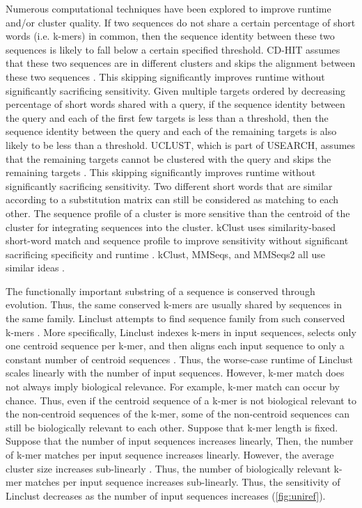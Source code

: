 \documentclass[11pt,letterpaper]{article}
\begin{document}
Numerous computational techniques have been explored to improve runtime and/or cluster quality.
If two sequences do not share a certain percentage of short words (i.e. k-mers) in common, then the sequence identity between these two sequences is likely to fall below a certain specified threshold.
CD-HIT assumes that these two sequences are in different clusters and skips the alignment between these two sequences \citep{li2002tolerating}.
This skipping significantly improves runtime without significantly sacrificing sensitivity.
Given multiple targets ordered by decreasing percentage of short words shared with a query, if the sequence identity between the query and each of the first few targets is less than a threshold, then the sequence identity between the query and each of the remaining targets is also likely to be less than a threshold.
UCLUST, which is part of USEARCH, assumes that the remaining targets cannot be clustered with the query and skips the remaining targets \citep{edgar2010search}.
This skipping significantly improves runtime without significantly sacrificing sensitivity.
Two different short words that are similar according to a substitution matrix can still be considered as matching to each other.
The sequence profile of a cluster is more sensitive than the centroid of the cluster for integrating sequences into the cluster.
kClust uses similarity-based short-word match and sequence profile to improve sensitivity without significant sacrificing specificity and runtime \citep{hauser2013kclust}.
kClust, MMSeqs, and MMSeqs2 all use similar ideas \citep{hauser2013kclust,hauser2016mmseqs,steinegger2017mmseqs2}.


The functionally important substring of a sequence is conserved through evolution.
Thus, the same conserved k-mers are usually shared by sequences in the same family.
Linclust attempts to find sequence family from such conserved k-mers \citep{steinegger2017linclust}.
More specifically, 
	Linclust indexes k-mers in input sequences, 
	selects only one centroid sequence per k-mer,
	and then aligns each input sequence to only a constant number of centroid sequences \citep{steinegger2017linclust}.
Thus, the worse-case runtime of Linclust scales linearly with the number of input sequences.
However, k-mer match does not always imply biological relevance.
For example, k-mer match can occur by chance.
Thus, 
	even if the centroid sequence of a k-mer is not biological relevant to the non-centroid sequences of the k-mer, 
	some of the non-centroid sequences can still be biologically relevant to each other.
Suppose that k-mer length is fixed.
Suppose that the number of input sequences increases linearly,
Then, 
	the number of k-mer matches per input sequence increases linearly.
However,
	the average cluster size increases sub-linearly \citep[Fig. 3]{suzek2014uniref}.
Thus, the number of biologically relevant k-mer matches per input sequence increases sub-linearly.
Thus, the sensitivity of Linclust decreases as the number of input sequences increases (\cref{fig:uniref}).
\end{document}
